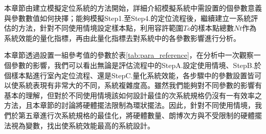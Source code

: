 本章節由建立模擬定位系統的方法開始，詳細介紹模擬系統中需設置的個參數意義與參數數值如何抉擇；能夠模擬Step1.至Step4.的定位流程後，繼續建立一系統評估的方法，針對不同使用情境設定樣本點，利用容許範圍$To$的樣本點總數$Nt$作為系統效能的量化指標，再由此量化指標去對系統中的各參數影響進行分析。

本章節透過設置一組參考值的參數於表\ref{tab:para_reference}，在分析中一次觀察一個參數的影響，我們可以看出無論是評估流程中的StepA.設定使用情境、StepB.於個樣本點進行室內定位流程、還是StepC.量化系統效能，各步驟中的參數設置皆可以使系統表現有非常大的不同，系統複雜度高。雖然我們能夠對不同參數的影響有基本的理解，但對於不同使用情境該如何設計最佳的次系統規格仍沒有一有效率之方法，且本章節的討論將硬體擺法限制為環狀擺法。因此，針對不同使用情境，我們於第五章進行次系統規格的最佳化，將硬體數量、朗博次方與不受限制的硬體擺法視為變數，找出使系統效能最高的系統設計。






































